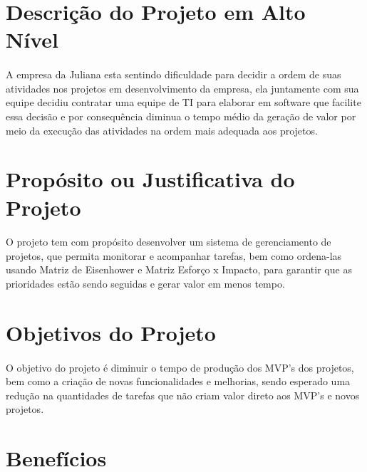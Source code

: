 



  \maketitle
  \newpage
{}

\section{Descrição do Projeto em Alto Nível}
  \paragraph{}
    A empresa da Juliana esta sentindo dificuldade para decidir a ordem de suas atividades nos projetos em desenvolvimento da empresa, ela juntamente com sua equipe decidiu contratar uma equipe de TI para elaborar em software que facilite essa decisão e por consequência diminua o tempo médio da geração de valor por meio da execução das atividades na ordem mais adequada aos projetos.

\section{Propósito ou Justificativa do Projeto}
  \paragraph{}
    O projeto tem com propósito desenvolver um sistema de gerenciamento de projetos, que permita monitorar e acompanhar tarefas, bem como ordena-las usando Matriz de Eisenhower e Matriz Esforço x Impacto, para garantir que as prioridades estão sendo seguidas e gerar valor em menos tempo.

\section{Objetivos do Projeto}
  \paragraph{}
    O objetivo do projeto é diminuir o tempo de produção dos MVP's dos projetos, bem como a criação de novas funcionalidades e melhorias, sendo esperado uma redução na quantidades de tarefas que não criam valor direto aos MVP's e novos projetos.

\section{Benefícios}
